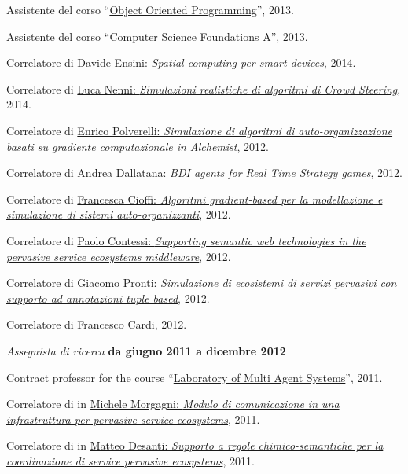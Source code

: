 \documentclass[10pt]{article}
\newenvironment{outerlist}[1][\enskip\textbullet]%
        {\begin{itemize}[#1]}{\end{itemize}%
         \vspace{-.6\baselineskip}}
\newenvironment{innerlist}[1][\enskip\textbullet]%
        {\begin{compactitem}[#1]}{\end{compactitem}}
\newcommand{\halfblankline}{\quad\vspace{-0.5\baselineskip}\pagebreak[3]}
\begin{document}
\begin{outerlist}
\begin{innerlist}
      \item Assistente del corso ``\href{http://apice.unibo.it/xwiki/bin/view/Courses/OOP1314}{Object Oriented Programming}'', 2013.
      \item Assistente del corso ``\href{http://www.apice.unibo.it/xwiki/bin/view/Courses/FINFA1213/}{Computer Science Foundations A}'', 2013.
      \item Correlatore di \href{http://amslaurea.unibo.it/7990/}{Davide Ensini: \textit{Spatial computing per smart devices}}, 2014.
      \item Correlatore di \href{http://amslaurea.unibo.it/6927/}{Luca Nenni: \textit{Simulazioni realistiche di algoritmi di Crowd Steering}}, 2014.
      \item Correlatore di \href{http://amslaurea.unibo.it/5293/}{Enrico Polverelli: \textit{Simulazione di algoritmi di auto-organizzazione basati su gradiente computazionale in Alchemist}}, 2012.
      \item Correlatore di \href{http://amslaurea.unibo.it/4217/}{Andrea Dallatana: \textit{BDI agents for Real Time Strategy games}}, 2012.
      \item Correlatore di \href{http://amslaurea.unibo.it/4088/}{Francesca Cioffi: \textit{Algoritmi gradient-based per la modellazione e simulazione di sistemi auto-organizzanti}}, 2012.
      \item Correlatore di \href{http://amslaurea.unibo.it/4074/}{Paolo Contessi: \textit{Supporting semantic web technologies in the pervasive service ecosystems middleware}}, 2012.
      \item Correlatore di \href{http://www.alice.unibo.it/xwiki/bin/view/Theses/ProntiAlchemistSapere/}{Giacomo Pronti: \textit{Simulazione di ecosistemi di servizi pervasivi con supporto ad annotazioni tuple based}}, 2012.
      \item Correlatore di Francesco Cardi, 2012.
    \end{innerlist}
\item[] \textit{Assegnista di ricerca} \hfill \textbf{da giugno 2011 a dicembre 2012}
    \begin{innerlist}
      \item Contract professor for the course ``\href{http://apice.unibo.it/xwiki/bin/view/Courses/SmaLm1112Lab}{Laboratory of Multi Agent Systems}'', 2011.
      \item Correlatore di in \href{http://apice.unibo.it/xwiki/bin/view/Theses/SapereComm}{Michele Morgagni: \textit{Modulo di comunicazione in una infrastruttura per pervasive service ecosystems}}, 2011.
      \item Correlatore di in \href{http://www.alice.unibo.it/xwiki/bin/view/Theses/LSAspace}{Matteo Desanti: \textit{Supporto a regole chimico-semantiche per la coordinazione di service pervasive ecosystems}}, 2011.
    \end{innerlist}
\halfblankline
\end{outerlist}
\end{document}
